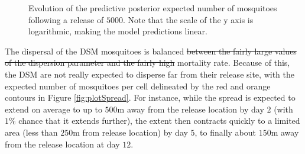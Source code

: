 \documentclass[]{bmcart}
\providecommand{\DIFaddtex}[1]{{\protect\color{blue}\uwave{#1}}} %
\providecommand{\DIFdeltex}[1]{{\protect\color{red}\sout{#1}}}                      %
\providecommand{\DIFaddbegin}{} %
\providecommand{\DIFaddend}{} %
\providecommand{\DIFdelbegin}{} %
\providecommand{\DIFdelend}{} %
\providecommand{\DIFadd}[1]{\texorpdfstring{\DIFaddtex{#1}}{#1}} %
\providecommand{\DIFdel}[1]{\texorpdfstring{\DIFdeltex{#1}}{}} %
\newcommand{\DIFscaledelfig}{0.5}
\newlength{\DIFdelgraphicswidth} %
\newlength{\DIFdelgraphicsheight} %
\newcommand{\DIFaddincludegraphics}[2][]{{\color{blue}\fbox{\DIFOincludegraphics[#1]{#2}}}} %
\newcommand{\DIFdelincludegraphics}[2][]{%
\sbox{\DIFdelgraphicsbox}{\DIFOincludegraphics[#1]{#2}}%
\settoboxwidth{\DIFdelgraphicswidth}{\DIFdelgraphicsbox} %
\settoboxtotalheight{\DIFdelgraphicsheight}{\DIFdelgraphicsbox} %
\scalebox{\DIFscaledelfig}{%
\parbox[b]{\DIFdelgraphicswidth}{\usebox{\DIFdelgraphicsbox}\\[-\baselineskip] \rule{\DIFdelgraphicswidth}{0em}}\llap{\resizebox{\DIFdelgraphicswidth}{\DIFdelgraphicsheight}{%
\setlength{\unitlength}{\DIFdelgraphicswidth}%
\begin{picture}(1,1)%
\thicklines\linethickness{2pt} %
{\color[rgb]{1,0,0}\put(0,0){\framebox(1,1){}}}%
{\color[rgb]{1,0,0}\put(0,0){\line( 1,1){1}}}%
{\color[rgb]{1,0,0}\put(0,1){\line(1,-1){1}}}%
\end{picture}%
}\hspace*{3pt}}} %
} %
\DeclareRobustCommand{\DIFaddbegin}{\DIFOaddbegin \let\includegraphics\DIFaddincludegraphics} %
\DeclareRobustCommand{\DIFaddend}{\DIFOaddend \let\includegraphics\DIFOincludegraphics} %
\DeclareRobustCommand{\DIFdelbegin}{\DIFOdelbegin \let\includegraphics\DIFdelincludegraphics} %
\DeclareRobustCommand{\DIFdelend}{\DIFOaddend \let\includegraphics\DIFOincludegraphics} %
\begin{document}
\begin{figure}[t]
\caption[Evolution of the expected number of mosquitoes following a release of $5000$ at location R]{ Evolution of the predictive posterior expected number of mosquitoes following a release of $5000$. Note that the scale of the y axis is logarithmic, making the model predictions linear.}\label{fig:plotTimeMoxMaxLoc}
\end{figure}

The dispersal of the DSM mosquitoes is balanced \DIFdelbegin \DIFdel{between the fairly large values of the dispersion parameter and the fairly high }\DIFdelend \DIFaddbegin \DIFadd{by the }\DIFaddend mortality rate. Because of this, the DSM are not really expected to disperse far from their release site, with the expected number of mosquitoes per cell delineated by the red and orange contours in Figure \ref{fig:plotSpread}. For instance, while the spread is expected to extend on average to up to $500$m away from the release location by day $2$ (with $1\%$ chance that it extends further), the extent then contracts quickly to a limited area (less than $250$m from release location) by day $5$, to finally about $150$m away from the release location at day $12$.
\end{document}
